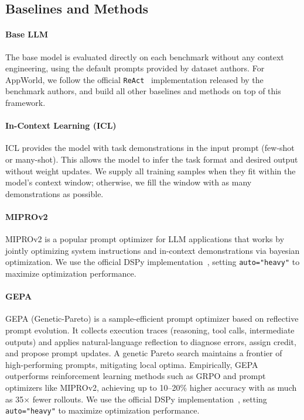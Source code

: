 \subsection{Baselines and Methods}

\paragraph{Base LLM} The base model is evaluated directly on each benchmark without any context engineering, using the default prompts provided by dataset authors.  
For AppWorld, we follow the official \texttt{ReAct}~\citep{yao2023react} implementation released by the benchmark authors, and build all other baselines and methods on top of this framework. 

\paragraph{In-Context Learning (ICL)~\citep{agarwal2024many}} ICL provides the model with task demonstrations in the input prompt (few-shot or many-shot). 
This allows the model to infer the task format and desired output without weight updates.  
We supply all training samples when they fit within the model’s context window; otherwise, we fill the window with as many demonstrations as possible.

\paragraph{MIPROv2~\citep{opsahl2024optimizing}} MIPROv2 is a popular prompt optimizer for LLM applications that works by jointly optimizing system instructions and in-context demonstrations via bayesian optimization.   
We use the official DSPy implementation~\citep{DSPyMIPROv2}, setting \verb|auto="heavy"| to maximize optimization performance.

\paragraph{GEPA~\citep{agrawal2025gepa}} GEPA (Genetic-Pareto) is a sample-efficient prompt optimizer based on reflective prompt evolution. 
It collects execution traces (reasoning, tool calls, intermediate outputs) and applies natural-language reflection to diagnose errors, assign credit, and propose prompt updates. 
A genetic Pareto search maintains a frontier of high-performing prompts, mitigating local optima.  
Empirically, GEPA outperforms reinforcement learning methods such as GRPO and prompt optimizers like MIPROv2, achieving up to 10–20\% higher accuracy with as much as 35× fewer rollouts. 
We use the official DSPy implementation~\citep{DSPyGEPA}, setting \verb|auto="heavy"| to maximize optimization performance.

